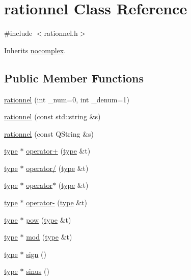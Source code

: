 \hypertarget{classrationnel}{\section{rationnel Class Reference}
\label{classrationnel}
}


{\ttfamily \#include $<$rationnel.\-h$>$}



Inherits \hyperlink{classnocomplex}{nocomplex}.

\subsection*{Public Member Functions}
\begin{DoxyCompactItemize}
\item 
\hyperlink{classrationnel_a92b822d1a85e77456f9db2d0c691d74e}{rationnel} (int \-\_\-num=0, int \-\_\-denum=1)
\item 
\hyperlink{classrationnel_a5dd117aa62b25bc976f753251170128b}{rationnel} (const std\-::string \&s)
\item 
\hyperlink{classrationnel_a7411453ee0e517a0008e563938033750}{rationnel} (const Q\-String \&s)
\item 
\hyperlink{classtype}{type} $\ast$ \hyperlink{classrationnel_a14d9d411058e146e075ccf16997e525e}{operator+} (\hyperlink{classtype}{type} \&t)
\item 
\hyperlink{classtype}{type} $\ast$ \hyperlink{classrationnel_ae36b04407cc70d425ed0292975b0d1e9}{operator/} (\hyperlink{classtype}{type} \&t)
\item 
\hyperlink{classtype}{type} $\ast$ \hyperlink{classrationnel_a49250cb9001aad230e5193515ee74efa}{operator$\ast$} (\hyperlink{classtype}{type} \&t)
\item 
\hyperlink{classtype}{type} $\ast$ \hyperlink{classrationnel_a3bdf6de1a2526ddafbf1831a9af11dc9}{operator-\/} (\hyperlink{classtype}{type} \&t)
\item 
\hyperlink{classtype}{type} $\ast$ \hyperlink{classrationnel_afd9fd9a30f034952ce889d46a07de617}{pow} (\hyperlink{classtype}{type} \&t)
\item 
\hyperlink{classtype}{type} $\ast$ \hyperlink{classrationnel_a546c22eedcb7ce551bb04be7dc527573}{mod} (\hyperlink{classtype}{type} \&t)
\item 
\hyperlink{classtype}{type} $\ast$ \hyperlink{classrationnel_aa73709167be428fafc4d95a31f4c3cc0}{sign} ()
\item 
\hyperlink{classtype}{type} $\ast$ \hyperlink{classrationnel_ac6ad55bfba79a0169d8cf1fb82354b89}{sinus} ()

\end{DoxyCompactItemize}
